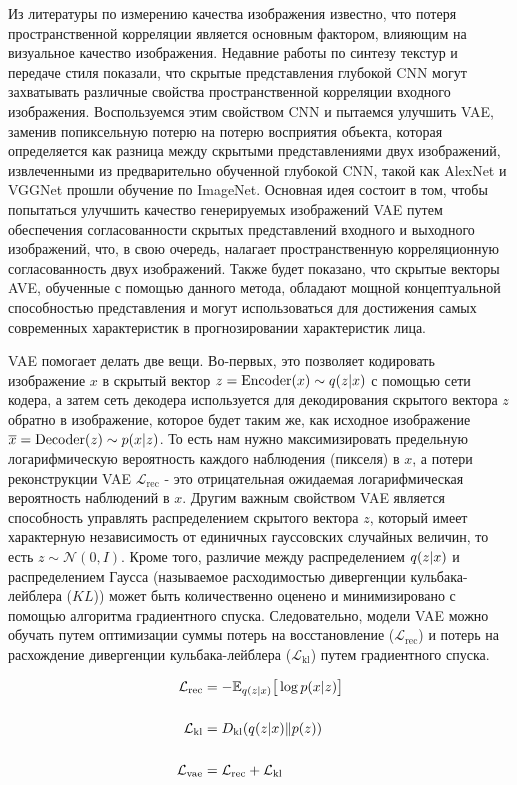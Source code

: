 Из литературы по измерению качества изображения известно, что потеря пространственной корреляции является основным фактором, влияющим на визуальное качество изображения. Недавние работы по синтезу текстур и передаче стиля показали, что скрытые представления глубокой CNN могут захватывать различные свойства пространственной корреляции входного изображения. Воспользуемся этим свойством CNN и пытаемся улучшить VAE, заменив попиксельную потерю на потерю восприятия объекта, которая определяется как разница между скрытыми представлениями двух изображений, извлеченными из предварительно обученной глубокой CNN, такой как AlexNet и VGGNet прошли обучение по ImageNet. Основная идея состоит в том, чтобы попытаться улучшить качество генерируемых изображений VAE путем обеспечения согласованности скрытых представлений входного и выходного изображений, что, в свою очередь, налагает пространственную корреляционную согласованность двух изображений. Также будет показано, что скрытые векторы AVE, обученные с помощью данного метода, обладают мощной концептуальной способностью представления и могут использоваться для достижения самых современных характеристик в прогнозировании характеристик лица.

VAE помогает делать две вещи. Во-первых, это позволяет кодировать изображение $x$ в скрытый вектор $z = \text{Encoder}(x) \sim q(z \arrowvert x)$ с помощью сети кодера, а затем сеть декодера используется для декодирования скрытого вектора $z$ обратно в изображение, которое будет таким же, как исходное изображение $\overline{x} = \text{Decoder}(z) \sim p (x \arrowvert z)$. То есть нам нужно максимизировать предельную логарифмическую вероятность каждого наблюдения (пикселя) в $x$, а потери реконструкции VAE $\mathcal{L}_{\text{rec}}$ - это отрицательная ожидаемая логарифмическая вероятность наблюдений в $x$. Другим важным свойством VAE является способность управлять распределением скрытого вектора $z$, который имеет характерную независимость от единичных гауссовских случайных величин, то есть $z \sim \mathcal{N}(0, I)$. Кроме того, различие между распределением $q(z \arrowvert x)$ и распределением Гаусса (называемое расходимостью дивергенции кульбака-лейблера ($KL$)) может быть количественно оценено и минимизировано с помощью алгоритма градиентного спуска. Следовательно, модели VAE можно обучать путем оптимизации суммы потерь на восстановление ($\mathcal{L}_{\text{rec}}$) и потерь на расхождение дивергенции кульбака-лейблера ($\mathcal{L}_{\text{kl}}$) путем градиентного спуска.

\begin{align}
\mathcal{L}_{\text{rec}} &{}= -\mathbb{E}_{q(z \arrowvert x)} \big[ \log{p(x \arrowvert z)} \big]\label{eq:14} \\ \nonumber \\
\mathcal{L}_{\text{kl}} &{}= D_{\text{kl}}(q(z \arrowvert x) \| p(z)) \label{eq:15}\\ \nonumber \\
\mathcal{L}_{\text{vae}} &{}=\mathcal{L}_{\text{rec}} + \mathcal{L}_{\text{kl}} \label{eq:16}
\end{align}

